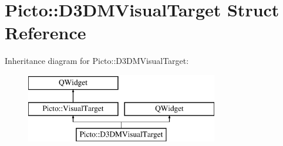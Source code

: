 \hypertarget{struct_picto_1_1_d3_d_m_visual_target}{\section{Picto\-:\-:D3\-D\-M\-Visual\-Target Struct Reference}
\label{struct_picto_1_1_d3_d_m_visual_target}
}
Inheritance diagram for Picto\-:\-:D3\-D\-M\-Visual\-Target\-:\begin{figure}[H]
\begin{center}
\leavevmode
\includegraphics[height=3.000000cm]{struct_picto_1_1_d3_d_m_visual_target}
\end{center}
\end{figure}
